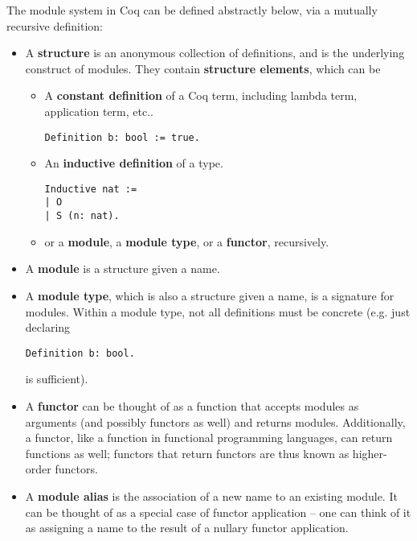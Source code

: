 The module system in Coq can be defined abstractly below, via a mutually
recursive definition:
\begin{itemize}
\item A \textbf{structure} is an anonymous collection of definitions, and is the
underlying construct of modules. They contain \textbf{structure elements},
which can be
\begin{itemize}
    \item A \textbf{constant definition} of a Coq term, including lambda term,
    application term, etc..

    \begin{verbatim}
Definition b: bool := true.
    \end{verbatim}

    \item An \textbf{inductive definition} of a type.

    \begin{verbatim}
Inductive nat :=
| O
| S (n: nat).
    \end{verbatim}

    \item or a \textbf{module}, a \textbf{module type}, or a \textbf{functor}, recursively.
    \end{itemize}

\item A \textbf{module} is a structure given a name.
\item A \textbf{module type}, which is also a structure given a name, is a
    signature for modules. Within a module type, not all definitions must be
    concrete (e.g. just declaring
\begin{verbatim}
Definition b: bool.
\end{verbatim}
    is sufficient).
\item A \textbf{functor} can be thought of as a function that accepts modules as
    arguments (and possibly functors as well) and returns modules. Additionally,
    a functor, like a function in functional programming languages, can return
    functions as well; functors that return functors are thus known as
    higher-order functors.
\item A \textbf{module alias} is the association of a new name to an existing
    module. It can be thought of as a special case of functor application -- one
    can think of it as assigning a name to the result of a nullary functor
    application.
\end{itemize}

